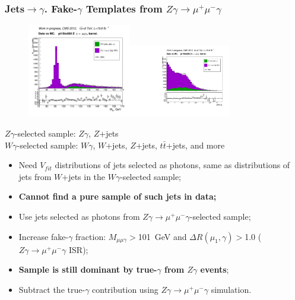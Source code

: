 \begin{frame}\frametitle{Jets$\rightarrow \gamma$. Fake-$\gamma$ Templates from $Z\gamma\rightarrow \mu^+ \mu^- \gamma$}

  \begin{figure}[htb]
    \begin{center}
       \includegraphics[width=0.40\textwidth]{../figs/figs_v11/MUON_ZGamma/PrepareYields/c_TotalDATAvsMC_Barrel__MpholeplepVERY_PRELIMINARY_pt15to500_.png}\includegraphics[width=0.40\textwidth]{../figs/figs_v11/MUON_ZGamma/PrepareYields/c_TotalDATAvsMC_Barrel__lep1PhoDeltaRVERY_PRELIMINARY_pt15to500_.pdf}\\
    \end{center}
  \end{figure}

\tiny
$Z\gamma$-selected sample: $Z\gamma$, $Z$+jets\\
$W\gamma$-selected sample: $W\gamma$, $W$+jets, $Z$+jets, $t\bar{t}$+jets, and more\\

  \begin{itemize}
     \tiny
     \item Need $V_{fit}$ distributions of jets selected as photons, same as distributions of jets from $W$+jets in the $W\gamma$-selected sample;
     \item {\bfseries{Cannot find a pure sample of such jets in data;}}
     \item Use jets selected as photons from $Z\gamma \rightarrow \mu^+ \mu^- \gamma$-selected sample;
     \item Increase fake-$\gamma$ fraction: $M_{\mu\mu\gamma}>$101~GeV and $\Delta R(\mu_{1},\gamma)>$1.0 ($Z\gamma\rightarrow\mu^+ \mu^- \gamma$ ISR);
     \item {\bfseries{Sample is still dominant by true-$\gamma$ from $Z\gamma$ events}};
     \item Subtract the true-$\gamma$ contribution using $Z\gamma \rightarrow \mu^+ \mu^- \gamma$ simulation.
  \end{itemize}

\end{frame}%
